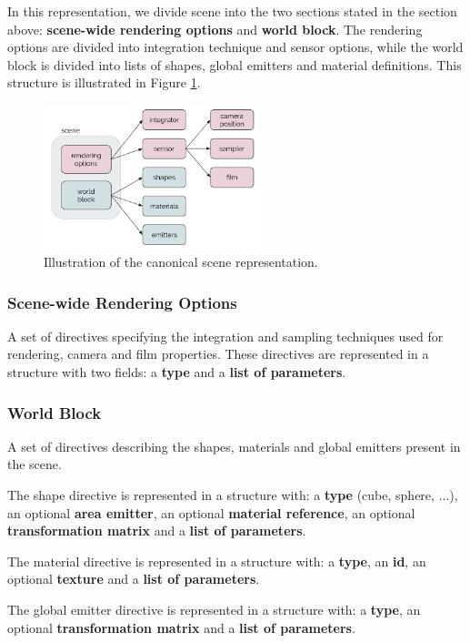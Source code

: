 \documentclass[10pt,conference]{IEEEtran}
\begin{document}
In this representation, we divide scene into the two sections stated in the 
section above: \textbf{scene-wide rendering options} and \textbf{world block}. 
The rendering options are divided into integration technique and sensor options, 
while the world block is divided into lists of shapes, global emitters and 
material definitions. This structure is illustrated in Figure 
\ref{fig:canonicalrep}.

\begin{figure}[h]
\centering
\includegraphics[width=2.5in]{figs/3_system_architecture/canonicalrep.png}
\caption{Illustration of the canonical scene representation.}
\label{fig:canonicalrep}
\end{figure}

\subsubsection{Scene-wide Rendering Options}
A set of directives specifying the integration and sampling techniques used for 
rendering, camera and film properties. These directives are represented in a 
structure with two fields: a \textbf{type} and a \textbf{list of parameters}.

\subsubsection{World Block}
A set of directives describing the shapes, materials and global emitters present in the scene. 

The shape directive is represented in a structure with: a \textbf{type} (cube, sphere, ...), an optional \textbf{area emitter}, an optional \textbf{material reference}, an optional \textbf{transformation matrix} and a \textbf{list of parameters}. 

The material directive is represented in a structure with: a \textbf{type}, an \textbf{id}, an optional \textbf{texture} and a \textbf{list of parameters}.

The global emitter directive is represented in a structure with: a \textbf{type}, an optional \textbf{transformation matrix} and a \textbf{list of parameters}.
\end{document}
